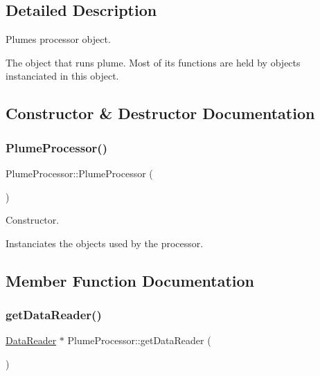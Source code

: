 \subsection{Detailed Description}
Plume\textquotesingle{}s processor object. 

The object that runs plume. Most of it\textquotesingle{}s functions are held by objects instanciated in this object. 

\subsection{Constructor \& Destructor Documentation}
\mbox{\label{class_plume_processor_a1462b7f98f4677da0dab2d98dd8da1e1}} 
\subsubsection{\texorpdfstring{Plume\+Processor()}{PlumeProcessor()}}
{\footnotesize\ttfamily Plume\+Processor\+::\+Plume\+Processor (\begin{DoxyParamCaption}{ }\end{DoxyParamCaption})}



Constructor. 

Instanciates the objects used by the processor. 

\subsection{Member Function Documentation}
\mbox{\label{class_plume_processor_ab24c4b6857ca26d462fce6be9e23cedd}} 
\subsubsection{\texorpdfstring{get\+Data\+Reader()}{getDataReader()}}
{\footnotesize\ttfamily \mbox{\hyperlink{class_data_reader}{Data\+Reader}} $\ast$ Plume\+Processor\+::get\+Data\+Reader (\begin{DoxyParamCaption}{ }\end{DoxyParamCaption})}



